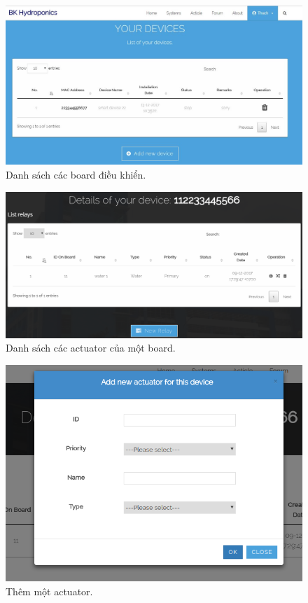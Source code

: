 \documentclass[a4paper,12pt,oneside]{article}
\begin{document}
\begin{center}
\begin{figure}[H]
\begin{center}
\includegraphics[scale=.5]{hinh/web_devices.jpg}
\end{center}
\caption{Danh sách các board điều khiển.}
\end{figure}

\begin{figure}[H]
\begin{center}
\includegraphics[scale=.55]{hinh/web_actuator_list.png}
\end{center}
\caption{Danh sách các actuator của một board.}
\end{figure}

\begin{figure}[H]
\begin{center}
\includegraphics[scale=.5]{hinh/web_add_actuator.png}
\end{center}
\caption{Thêm một actuator.}
\end{figure}


\end{center}
\end{document}
